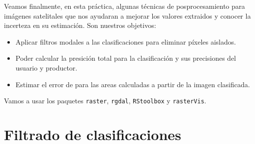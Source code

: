 Veamos finalmente, en esta pr\'actica, algunas t\'ecnicas de posprocesamiento
para im\'agenes satelitales que nos ayudaran a mejorar los valores extraidos
y conocer la incerteza en su estimaci\'on. Son nuestros objetivos:

\begin{itemize}
  \item Aplicar filtros modales a las clasificaciones para eliminar p\'ixeles
  aislados.
  \item Poder calcular la presici\'on total para la clasificaci\'on y sus precisiones
  del usuario y productor.
  \item Estimar el error de para las areas calculadas a partir de la imagen
  clasificada.
\end{itemize}

Vamos a usar los paquetes \texttt{raster}, \texttt{rgdal}, \texttt{RStoolbox} y
\texttt{rasterVis}.

\section{Filtrado de clasificaciones}

